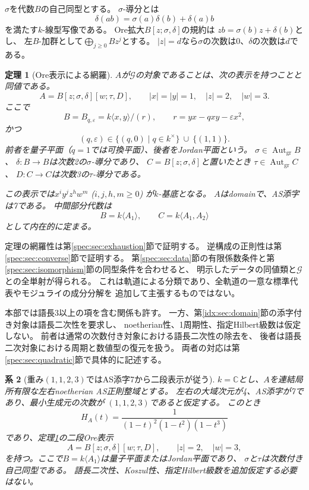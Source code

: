 \documentclass[11pt,a4paper]{ltjsarticle}
\newtheorem{theorem}{定理}[section]
\newtheorem{corollary}[theorem]{系}
\theoremstyle{definition}
\newcommand{\Aut}{\operatorname{Aut}}
\newcommand{\Gclass}{\mathcal G}
\begin{document}
$\sigma$を代数$B$の自己同型とする。
$\sigma$-導分とは
\[
\delta(ab)=\sigma(a)\delta(b)+\delta(a)b
\]
を満たす$k$-線型写像である。
Ore拡大$B[z;\sigma,\delta]$の規約は
$zb=\sigma(b)z+\delta(b)$とし、
左$B$-加群として$\bigoplus_{j\geq0}Bz^j$とする。
$|z|=d$なら$\sigma$の次数は0、$\delta$の次数は$d$である。

\begin{theorem}[Ore表示による網羅]\label{spec:thm:ore-exhaustion}
$A$が$\Gclass$の対象であることは、次の表示を持つことと同値である。
\begin{equation}\label{spec:eq:iterated-ore}
A=B[z;\sigma,\delta][w;\tau,D],\qquad |x|=|y|=1,\quad |z|=2,\quad |w|=3.
\end{equation}
ここで
\begin{equation}\label{spec:eq:plane}
B=B_{q,\varepsilon}
=k\langle x,y\rangle/(r),\qquad r=yx-qxy-\varepsilon x^2,
\end{equation}
かつ
\[
(q,\varepsilon)\in
\{(q,0)\mid q\in k^\times\}\ \cup\ \{(1,1)\}.
\]
前者を量子平面（$q=1$では可換平面）、後者をJordan平面という。
$\sigma\in\Aut_{\mathrm{gr}}B$、
$\delta:B\to B$は次数2の$\sigma$-導分であり、
$C=B[z;\sigma,\delta]$と置いたとき
$\tau\in\Aut_{\mathrm{gr}}C$、
$D:C\to C$は次数3の$\tau$-導分である。

この表示では$x^iy^jz^hw^m$ ($i,j,h,m\geq0$) が$k$-基底となる。
$A$はdomainで、AS添字は7である。
中間部分代数は
\begin{equation}\label{spec:eq:canonical-flag}
B=k\langle A_1\rangle,\qquad C=k\langle A_1,A_2\rangle
\end{equation}
として内在的に定まる。
\end{theorem}

定理の網羅性は第\ref{spec:sec:exhaustion}節で証明する。
逆構成の正則性は第\ref{spec:sec:converse}節で証明する。
第\ref{spec:sec:data}節の有限係数条件と第\ref{spec:sec:isomorphism}節の同型条件を合わせると、
明示したデータの同値類と$\Gclass$との全単射が得られる。
これは軌道による分類であり、全軌道の一意な標準代表やモジュライの成分分解を
追加して主張するものではない。

本部では語長3以上の項を含む関係も許す。
一方、第\ref{idx:sec:domain}節の添字付き対象は語長二次性を要求し、
noetherian性、1周期性、指定Hilbert級数は仮定しない。
前者は通常の次数付き対象における語長二次性の除去を、
後者は語長二次対象における周期と数値型の復元を扱う。
両者の対応は第\ref{spec:sec:quadratic}節で具体的に記述する。

\begin{corollary}[重み$(1,1,2,3)$ではAS添字7から二段表示が従う]
\label{spec:cor:index-seven-ore}
$k=\mathbb C$とし、$A$を連結局所有限な左右noetherian AS正則整域とする。
左右の大域次元が4、AS添字が7であり、最小生成元の次数が
$(1,1,2,3)$であると仮定する。
このとき
\[
H_A(t)=\frac{1}{(1-t)^2(1-t^2)(1-t^3)}
\]
であり、定理\ref{spec:thm:ore-exhaustion}の二段Ore表示
\[
A=B[z;\sigma,\delta][w;\tau,D],\qquad |z|=2,\quad |w|=3,
\]
を持つ。ここで$B=k\langle A_1\rangle$は量子平面またはJordan平面であり、
$\sigma$と$\tau$は次数付き自己同型である。
語長二次性、Koszul性、指定Hilbert級数を追加仮定する必要はない。
\end{corollary}
\end{document}

